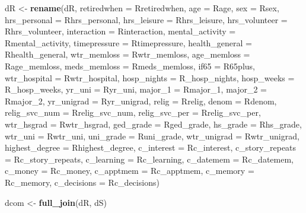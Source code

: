 \documentclass[]{article}
\newenvironment{Shaded}{\begin{snugshade}}{\end{snugshade}}
\newcommand{\DataTypeTok}[1]{\textcolor[rgb]{0.13,0.29,0.53}{#1}}
\newcommand{\DecValTok}[1]{\textcolor[rgb]{0.00,0.00,0.81}{#1}}
\newcommand{\KeywordTok}[1]{\textcolor[rgb]{0.13,0.29,0.53}{\textbf{#1}}}
\newcommand{\NormalTok}[1]{#1}
\newcommand{\StringTok}[1]{\textcolor[rgb]{0.31,0.60,0.02}{#1}}
\begin{document}
\begin{Shaded}
\begin{Highlighting}[]
\NormalTok{dR <-}\StringTok{ }\KeywordTok{rename}\NormalTok{(dR, }\DataTypeTok{retiredwhen =}\NormalTok{ Rretiredwhen, }
             \DataTypeTok{age =}\NormalTok{ Rage, }
             \DataTypeTok{sex =}\NormalTok{ Rsex,}
             \DataTypeTok{hrs_personal =}\NormalTok{ Rhrs_personal, }
             \DataTypeTok{hrs_leisure =}\NormalTok{ Rhrs_leisure, }
             \DataTypeTok{hrs_volunteer =}\NormalTok{ Rhrs_volunteer, }
             \DataTypeTok{interaction =}\NormalTok{ Rinteraction, }
             \DataTypeTok{mental_activity =}\NormalTok{ Rmental_activity, }
             \DataTypeTok{timepressure =}\NormalTok{ Rtimepressure, }
             \DataTypeTok{health_general =}\NormalTok{ Rhealth_general, }
             \DataTypeTok{wtr_memloss =}\NormalTok{ Rwtr_memloss, }
             \DataTypeTok{age_memloss =}\NormalTok{ Rage_memloss, }
             \DataTypeTok{meds_memloss =}\NormalTok{ Rmeds_memloss, }
             \DataTypeTok{if65 =}\NormalTok{ R65plus, }
             \DataTypeTok{wtr_hospital =}\NormalTok{ Rwtr_hospital, }
             \DataTypeTok{hosp_nights =}\NormalTok{ R_hosp_nights, }
             \DataTypeTok{hosp_weeks =}\NormalTok{ R_hosp_weeks, }
             \DataTypeTok{yr_uni =}\NormalTok{ Ryr_uni, }
             \DataTypeTok{major_1 =}\NormalTok{ Rmajor_}\DecValTok{1}\NormalTok{, }
             \DataTypeTok{major_2 =}\NormalTok{ Rmajor_}\DecValTok{2}\NormalTok{, }
             \DataTypeTok{yr_unigrad =}\NormalTok{ Ryr_unigrad, }
             \DataTypeTok{relig =}\NormalTok{ Rrelig, }
             \DataTypeTok{denom =}\NormalTok{ Rdenom, }
             \DataTypeTok{relig_svc_num =}\NormalTok{ Rrelig_svc_num, }
             \DataTypeTok{relig_svc_per =}\NormalTok{ Rrelig_svc_per, }
             \DataTypeTok{wtr_hsgrad =}\NormalTok{ Rwtr_hsgrad, }
             \DataTypeTok{ged_grade =}\NormalTok{ Rged_grade, }
             \DataTypeTok{hs_grade =}\NormalTok{ Rhs_grade, }
             \DataTypeTok{wtr_uni =}\NormalTok{ Rwtr_uni, }
             \DataTypeTok{uni_grade =}\NormalTok{ Runi_grade, }
             \DataTypeTok{wtr_unigrad =}\NormalTok{ Rwtr_unigrad, }
             \DataTypeTok{highest_degree =}\NormalTok{ Rhighest_degree,}
             \DataTypeTok{c_interest =}\NormalTok{ Rc_interest, }
             \DataTypeTok{c_story_repeats =}\NormalTok{ Rc_story_repeats, }
             \DataTypeTok{c_learning =}\NormalTok{ Rc_learning, }
             \DataTypeTok{c_datemem =}\NormalTok{ Rc_datemem, }
             \DataTypeTok{c_money =}\NormalTok{ Rc_money, }
             \DataTypeTok{c_apptmem =}\NormalTok{ Rc_apptmem, }
             \DataTypeTok{c_memory =}\NormalTok{ Rc_memory, }
             \DataTypeTok{c_decisions =}\NormalTok{ Rc_decisions)}

\NormalTok{dcom <-}\StringTok{ }\KeywordTok{full_join}\NormalTok{(dR, dS)}
\end{Highlighting}
\end{Shaded}
\end{document}

